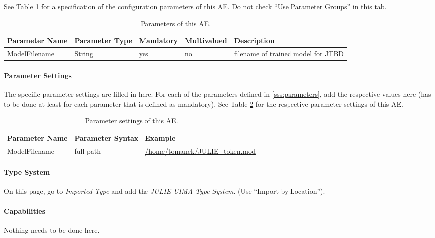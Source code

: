 \documentclass[11pt,a4paper,halfparskip]{scrartcl}
\begin{document}
See Table \ref{tab:parameters} for a specification of the
configuration parameters of this AE. Do not check ``Use Parameter
Groups'' in this tab.

\begin{table}[h!]
  \centering
  \begin{tabular}{|p{4cm}|p{2cm}|p{2cm}|p{2cm}|p{4cm}|}
    \hline
    Parameter Name & Parameter Type & Mandatory & Multivalued & Description \\
    \hline\hline
    ModelFilename & String & yes & no & filename of trained model for
    JTBD\\
    \hline
  \end{tabular}
  \caption{Parameters of this AE.}
  \label{tab:parameters}
\end{table}


\paragraph{Parameter Settings}
\label{sss:param_settings}

The specific parameter settings are filled in here. For each of the
parameters defined in \ref{sss:parameters}, add the respective values
here (has to be done at least for each parameter that is defined as
mandatory). See Table \ref{tab:param_settings} for the respective
parameter settings of this AE.

\begin{table}[h!]
  \centering
  \begin{tabular}{|p{4cm}|p{4cm}|p{7cm}|}
    \hline
    Parameter Name & Parameter Syntax & Example \\
    \hline\hline
    ModelFilename & full path & \url{/home/tomanek/JULIE_token.mod}\\
    \hline
  \end{tabular}
  \caption{Parameter settings of this AE.}
  \label{tab:param_settings}
\end{table}

\paragraph{Type System}
\label{sss:type_system}
On this page, go to \emph{Imported Type} and add the \emph{JULIE UIMA
  Type System}. (Use ``Import by Location'').


\paragraph{Capabilities}
Nothing needs to be done here.
\end{document}

